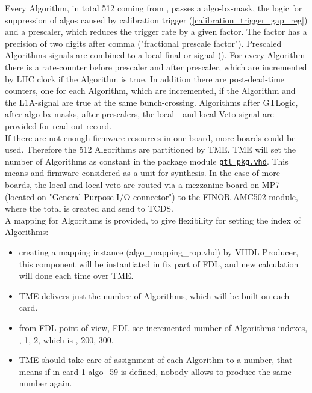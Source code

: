 Every Algorithm, in total 512 coming from \ugtl, passes a algo-bx-mask, the logic for suppression of algos caused by calibration trigger (\ref{calibration_trigger_gap_reg}) and a prescaler, which reduces the trigger rate by a given factor. The factor has a precision of two digits after comma ("fractional prescale factor"). Prescaled Algorithms signals are combined to a local final-or-signal (\finor).
For every Algorithm there is a rate-counter before prescaler and after prescaler, which are incremented by LHC clock if the Algorithm is true. In addition there are post-dead-time counters, one for each Algorithm, which are incremented,
if the Algorithm and the L1A-signal are true at the same bunch-crossing.
Algorithms after GTLogic, after algo-bx-masks, after prescalers, the local \finor- and local Veto-signal are provided for read-out-record.\\
If there are not enough firmware resources in one \ugt board, more boards could be used. Therefore the 512 Algorithms are partitioned by TME. TME will set the number of Algorithms as
constant in the package module \href{\gitbranch/firmware/hdl/packages/gtl_pkg.vhd}{\texttt{\textquotesingle gtl\_pkg.vhd\textquotesingle }}. This means \ugtl and \ufdl firmware considered as a unit for synthesis. In the case of more \ugt boards, the local \finor and local veto are routed via
a mezzanine board on MP7 (located on "General Purpose I/O connector") to the FINOR-AMC502 module, where the total \finor is created and send to TCDS.\\
A mapping for Algorithms is provided, to give flexibility for setting the index of Algorithms:
\begin {itemize}
\item creating a mapping instance (algo\_mapping\_rop.vhd) by VHDL Producer, this component will be instantiated in fix part of FDL, and new calculation will done each time over TME.
\item TME delivers just the number of Algorithms, which will be built on each card.
\item from FDL point of view, FDL see incremented number of Algorithms indexes, , 1, 2, which is , 200, 300.
\item TME should take care of assignment of each Algorithm to a number, that means if in card 1 algo\_59 is defined, nobody allows to produce the same number again.
\end {itemize}

